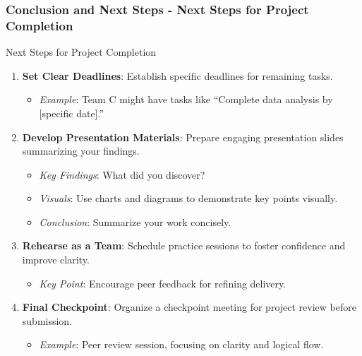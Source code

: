 \documentclass{beamer}
\begin{document}
\begin{frame}[fragile]
    \frametitle{Conclusion and Next Steps - Next Steps for Project Completion}
    \begin{block}{Next Steps for Project Completion}
        \begin{enumerate}
            \item \textbf{Set Clear Deadlines}: Establish specific deadlines for remaining tasks.
            \begin{itemize}
                \item \textit{Example}: Team C might have tasks like “Complete data analysis by [specific date].”
            \end{itemize}

            \item \textbf{Develop Presentation Materials}: Prepare engaging presentation slides summarizing your findings.
            \begin{itemize}
                \item \textit{Key Findings}: What did you discover?
                \item \textit{Visuals}: Use charts and diagrams to demonstrate key points visually.
                \item \textit{Conclusion}: Summarize your work concisely.
            \end{itemize}

            \item \textbf{Rehearse as a Team}: Schedule practice sessions to foster confidence and improve clarity.
            \begin{itemize}
                \item \textit{Key Point}: Encourage peer feedback for refining delivery.
            \end{itemize}

            \item \textbf{Final Checkpoint}: Organize a checkpoint meeting for project review before submission.
            \begin{itemize}
                \item \textit{Example}: Peer review session, focusing on clarity and logical flow.
            \end{itemize}
        \end{enumerate}
    \end{block}
\end{frame}
\end{document}
